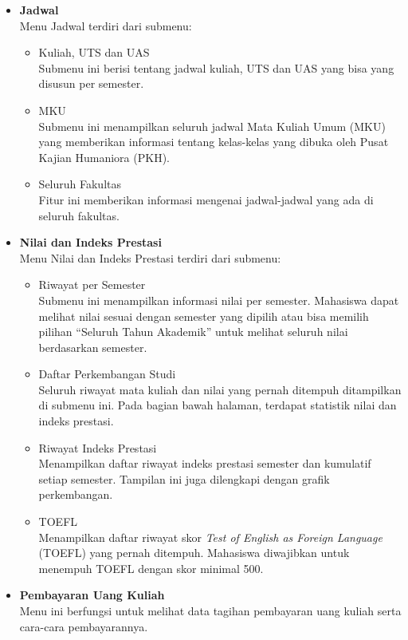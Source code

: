 \begin{enumerate}
\begin{itemize}
		\item \textbf{ Jadwal}\\
		Menu Jadwal terdiri dari submenu: 
		\begin{itemize}
			\item Kuliah, UTS dan UAS \\
			Submenu ini berisi tentang jadwal kuliah, UTS dan UAS yang bisa yang disusun per semester. 
			\item MKU \\
			Submenu ini menampilkan seluruh jadwal Mata Kuliah Umum (MKU) yang memberikan informasi tentang kelas-kelas yang dibuka oleh Pusat Kajian Humaniora (PKH). 
			\item Seluruh Fakultas \\
			Fitur ini memberikan informasi mengenai jadwal-jadwal yang ada di seluruh fakultas.
		\end{itemize}
		
		\item \textbf{Nilai dan Indeks Prestasi}\\
		Menu Nilai dan Indeks Prestasi terdiri dari submenu: 
		\begin{itemize}
			\item Riwayat per Semester \\
			Submenu ini menampilkan informasi nilai per semester. Mahasiswa dapat melihat nilai sesuai dengan semester yang dipilih atau bisa memilih
pilihan "`Seluruh Tahun Akademik"' untuk melihat seluruh nilai berdasarkan semester.
			\item Daftar Perkembangan Studi \\
			Seluruh riwayat mata kuliah dan nilai yang pernah ditempuh ditampilkan di submenu ini. Pada bagian bawah halaman, terdapat statistik nilai dan indeks prestasi. 
			\item Riwayat Indeks Prestasi \\
			Menampilkan daftar riwayat indeks prestasi semester dan kumulatif setiap semester. Tampilan ini juga dilengkapi dengan grafik perkembangan. 
			\item TOEFL \\
			Menampilkan daftar riwayat skor \textit{ Test of English as Foreign Language} (TOEFL) yang pernah ditempuh. Mahasiswa diwajibkan untuk menempuh TOEFL dengan skor minimal 500.
		\end{itemize}
		
		\item \textbf{Pembayaran Uang Kuliah}\\
		Menu ini berfungsi untuk melihat data tagihan pembayaran uang kuliah serta cara-cara pembayarannya.
	\end{itemize}
	

\end{enumerate}
